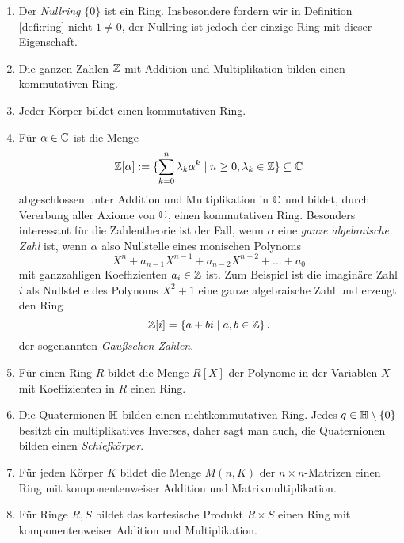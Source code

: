 \documentclass{book}
\begin{document}
\begin{exas}
    \label{exas:ringe}
    \begin{enumerate}
        \item Der \emph{Nullring} $\{0\}$ ist ein Ring. Insbesondere fordern
            wir in Definition \ref{defi:ring} nicht $1 \ne 0$, der Nullring ist
            jedoch der einzige Ring mit dieser Eigenschaft.
        \item Die ganzen Zahlen $\mathbb{Z}$ mit Addition und Multiplikation bilden einen kommutativen Ring. 
        \item Jeder Körper bildet einen kommutativen Ring. 
        \item Für $\alpha \in \mathbb{C}$ ist die Menge 
            \[
                \mathbb{Z}[\alpha] := \{\sum_{k=0}^n \lambda_k \alpha^k \; | \; n \ge 0, \lambda_k \in \mathbb{Z}\} \subseteq \mathbb{C}
            \]
            abgeschlossen unter Addition und Multiplikation in $\mathbb{C}$ und bildet,
            durch Vererbung aller Axiome von $\mathbb{C}$, einen kommutativen Ring.
            Besonders interessant für die Zahlentheorie ist der Fall, wenn
            $\alpha$ eine \emph{ganze algebraische Zahl} ist, wenn $\alpha$
            also Nullstelle eines monischen Polynoms
            \[
                X^n + a_{n-1} X^{n-1} + a_{n-2} X^{n-2} + ... + a_0
            \]
            mit ganzzahligen Koeffizienten $a_i \in \mathbb{Z}$ ist. 
            Zum Beispiel ist die imaginäre Zahl $i$ als Nullstelle des Polynoms
            $X^2 + 1$ eine ganze algebraische Zahl und erzeugt den Ring
            \[
                \mathbb{Z}[i] = \left\{ a + b i \; | \; a,b \in \mathbb{Z} \right\}.
            \]
            der sogenannten \emph{Gaußschen Zahlen}.

        \item Für einen Ring $R$ bildet die Menge $R[X]$ der Polynome in der
            Variablen $X$ mit Koeffizienten in $R$ einen Ring.
        \item Die Quaternionen $\mathbb{H}$ bilden einen nichtkommutativen Ring. Jedes $q \in \mathbb{H}
            \setminus \{0\}$ besitzt ein multiplikatives Inverses, daher
            sagt man auch, die Quaternionen bilden einen {\em Schiefkörper}. 
        \item Für jeden Körper $K$ bildet die Menge $M(n,K)$ der $n \times
            n$-Matrizen einen Ring mit komponentenweiser Addition und
            Matrixmultiplikation.
        \item Für Ringe $R,S$ bildet das kartesische Produkt $R \times S$
            einen Ring mit komponentenweiser Addition und Multiplikation.
    \end{enumerate}
\end{exas}
\end{document}
